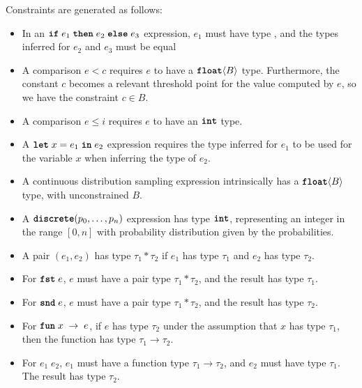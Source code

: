 \documentclass[acmsmall,screen,dvipsnames,x11names,nonacm,anonymous,review]{acmart}
\newcommand{\letkw}{\text{\ttfamily\bfseries let}}
\newcommand{\inkw}{\text{\ttfamily\bfseries in}}
\newcommand{\ifkw}{\text{\ttfamily\bfseries if}}
\newcommand{\thenkw}{\text{\ttfamily\bfseries then}}
\newcommand{\elsekw}{\text{\ttfamily\bfseries else}}
\newcommand{\discrete}{\text{\ttfamily\bfseries discrete}}
\newcommand{\fstkw}{\text{\ttfamily\bfseries fst}}
\newcommand{\sndkw}{\text{\ttfamily\bfseries snd}}
\newcommand{\funkw}{\text{\ttfamily\bfseries fun}}
\newcommand{\bool}{\text{\ttfamily\bfseries bool}}
\newcommand{\intty}{\text{\ttfamily\bfseries int}}
\newcommand{\float}{\text{\ttfamily\bfseries float}}
\begin{document}
Constraints are generated as follows:
\begin{itemize}
    \item In an $\ifkw \; e_1\; \thenkw \; e_2\; \elsekw \; e_3$ expression, $e_1$ must have type \bool, and the types inferred for $e_2$ and $e_3$ must be equal
    \item A comparison $e < c$ requires $e$ to have a $\float\langle B \rangle$ type. Furthermore, the constant $c$ becomes a relevant threshold point for the value computed by $e$, so we have the constraint $c \in B$.
    \item A comparison $e \leq i$ requires $e$ to have an $\intty$ type.
    \item A $\letkw \; x = e_1 \; \inkw \; e_2$ expression requires the type inferred for $e_1$ to be used for the variable $x$ when inferring the type of $e_2$.
    \item A continuous distribution sampling expression intrinsically has a $\float\langle B \rangle$ type, with unconstrained $B$.
    \item A $\discrete(p_0, \ldots, p_n)$ expression has type $\intty$, representing an integer in the range $[0,n]$ with probability distribution given by the probabilities.
    \item A pair $(e_1, e_2)$ has type $\tau_1 * \tau_2$ if $e_1$ has type $\tau_1$ and $e_2$ has type $\tau_2$.
    \item For $\fstkw \; e$, $e$ must have a pair type $\tau_1 * \tau_2$, and the result has type $\tau_1$.
    \item For $\sndkw \; e$, $e$ must have a pair type $\tau_1 * \tau_2$, and the result has type $\tau_2$.
    \item For $\funkw \; x \; \rightarrow \; e$, if $e$ has type $\tau_2$ under the assumption that $x$ has type $\tau_1$, then the function has type $\tau_1 \rightarrow \tau_2$.
    \item For $e_1 \; e_2$, $e_1$ must have a function type $\tau_1 \rightarrow \tau_2$, and $e_2$ must have type $\tau_1$. The result has type $\tau_2$.
\end{itemize}
\end{document}
